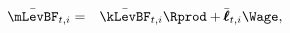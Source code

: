 \begin{eqnarray*}
   \bar{\mLevBF}_{t,i} & = & \bar{\kLevBF}_{t,i}\Rprod + \bar{\mathbf{\pmb{\ell}}}_{t,i} \Wage, \label{eq:mSticky}
\end{eqnarray*}
